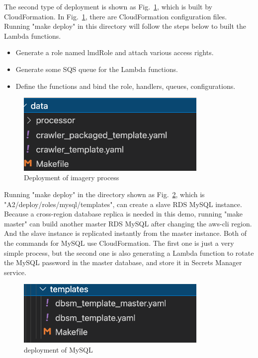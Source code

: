 \documentclass[conference]{IEEEtran}
\begin{document}
The second type of deployment is shown as Fig.~\ref{cf1}, which is built by CloudFormation. In Fig.~\ref{cf1}, there are CloudFormation configuration files. 
Running "make deploy" in this directory will follow the steps below to built the Lambda functions.

\begin{itemize}
    \item Generate a role named lmdRole and attach various access rights.
    \item Generate some SQS queue for the Lambda functions.
    \item Define the functions and bind the role, handlers, queues, configurations.
\end{itemize}

\begin{figure}[htbp]
    \centerline{\includegraphics[width=260pt]{images/cf-1.png}}
    \caption{Deployment of imagery process}
    \label{cf1}
\end{figure}

Running "make deploy" in the directory shown as Fig.~\ref{cf2}, which is "A2/deploy/roles/mysql/templates", can create a slave RDS MySQL instance. Because 
a cross-region database replica is needed in this demo, running "make master" can build another master RDS MySQL after changing the aws-cli region. And the 
slave instance is replicated instantly from the master instance. Both of the commands for MySQL use CloudFormation. The first one is just a very 
simple process, but the second one is also generating a Lambda function to rotate the MySQL password in the master database, and store it in Secrets Manager service. 

\begin{figure}[htbp]
    \centerline{\includegraphics[width=260pt]{images/cf-2.png}}
    \caption{deployment of MySQL}
    \label{cf2}
\end{figure}
\end{document}
